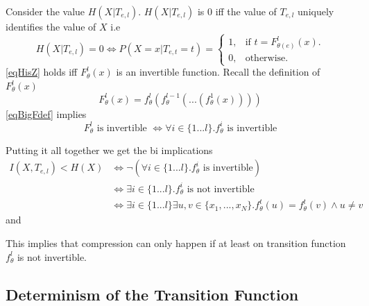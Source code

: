 \documentclass[dissertation.tex]{subfiles}
\begin{document}
Consider the value $H(X|T_{e,l})$. $H(X|T_{e,l})$ is 0 iff the value of
$T_{e,l}$ uniquely identifies the value of $X$ i.e
\begin{equation} 
  H(X|T_{e,l}) = 0
  \Leftrightarrow 
  P(X=x|T_{e,t}=t) = \begin{cases}
    1, & \text{if } t = F_{\theta(e)}^l(x). \\
    0, & \text{otherwise}.
  \end{cases}
  \label{eqHisZ}
\end{equation}
\autoref{eqHisZ} holds iff $F_{\theta}^l(x)$ is an invertible function.
Recall the definition of $F_{\theta}^l(x)$
\begin{equation}
  F_{\theta}^l(x) = f_{\theta}^l(f_{\theta}^{l-1}(...(f_{\theta}^1(x))))
  \label{eqBigFdef}
\end{equation}
\autoref{eqBigFdef} implies 
\begin{equation*}
  F_\theta^l \text{ is invertible } 
  \Leftrightarrow 
  \forall{i}\in{\{1...l\}}. f_\theta^i \text{ is invertible} 
\end{equation*}

Putting it all together we get the bi implications
\begin{align}
  I(X, T_{e,l}) < H(X) 
  &\Leftrightarrow 
  \neg(\forall{i}\in{\{1...l\}}. f_\theta^i \text{ is invertible})
  \nonumber\\
  &\Leftrightarrow 
  \exists{i}\in{\{1...l\}}. f_\theta^i \text{ is not invertible} 
  \nonumber\\
  &\Leftrightarrow 
  \exists{i}\in{\{1...l\}}\exists{u,v}\in{\{x_1,...,x_N\}}.
  f_\theta^t(u)=f_\theta^t(v) \land u \neq v 
\end{align}
and 

This implies that compression can only happen if at least on transition
function $f_\theta^l$ is not invertible.

\subsection{Determinism of the Transition Function}
\end{document}
